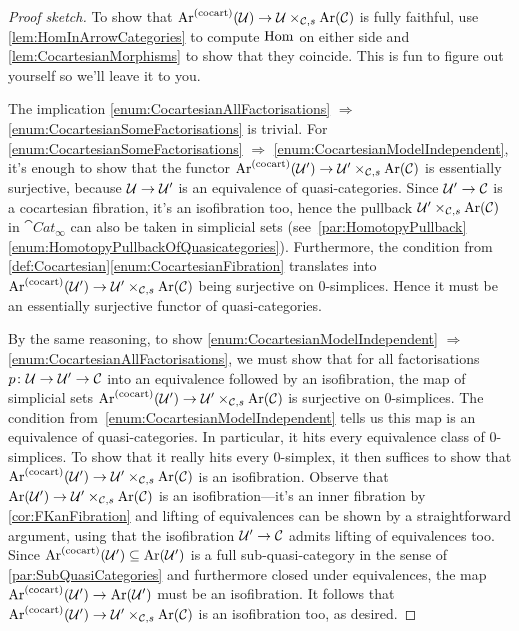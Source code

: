 \begin{proof}[Proof sketch]
	To show that $\operatorname{Ar}^{(\mathrm{cocart})}(\mathcal{U})\rightarrow \mathcal{U}\times_{\mathcal{C},s}\operatorname{Ar}(\mathcal{C})$ is fully faithful, use \cref{lem:HomInArrowCategories} to compute $\operatorname{Hom}$ on either side and \cref{lem:CocartesianMorphisms} to show that they coincide. This is fun to figure out yourself so we'll leave it to you.
	
	The implication \cref{enum:CocartesianAllFactorisations} $\Rightarrow$ \cref{enum:CocartesianSomeFactorisations} is trivial. For \cref{enum:CocartesianSomeFactorisations} $\Rightarrow$ \cref{enum:CocartesianModelIndependent}, it's enough to show that the functor $\operatorname{Ar}^{(\mathrm{cocart})}(\mathcal{U}')\rightarrow \mathcal{U}'\times_{\mathcal{C},s}\operatorname{Ar}(\mathcal{C})$ is essentially surjective, because $\mathcal{U}\rightarrow \mathcal{U}'$ is an equivalence of quasi-categories. Since $\mathcal{U}'\rightarrow \mathcal{C}$ is a cocartesian fibration, it's an isofibration too, hence the pullback $\mathcal{U}'\times_{\mathcal{C},s}\operatorname{Ar}(\mathcal{C})$ in $\cat{Cat}_\infty$ can also be taken in simplicial sets (see~\cref{par:HomotopyPullback}\cref{enum:HomotopyPullbackOfQuasicategories}). Furthermore, the condition from \cref{def:Cocartesian}\cref{enum:CocartesianFibration} translates into $\operatorname{Ar}^{(\mathrm{cocart})}(\mathcal{U}')\rightarrow \mathcal{U}'\times_{\mathcal{C},s}\operatorname{Ar}(\mathcal{C})$ being surjective on $0$-simplices. Hence it must be an essentially surjective functor of quasi-categories.
	
	By the same reasoning, to show \cref{enum:CocartesianModelIndependent} $\Rightarrow$ \cref{enum:CocartesianAllFactorisations}, we must show that for all factorisations $p\colon \mathcal{U}\rightarrow \mathcal{U}'\rightarrow \mathcal{C}$ into an equivalence followed by an isofibration, the map of simplicial sets $\operatorname{Ar}^{(\mathrm{cocart})}(\mathcal{U}')\rightarrow \mathcal{U}'\times_{\mathcal{C},s}\operatorname{Ar}(\mathcal{C})$ is surjective on $0$-simplices. The condition from~\cref{enum:CocartesianModelIndependent} tells us this map is an equivalence of quasi-categories. In particular, it hits every equivalence class of $0$-simplices. To show that it really hits every $0$-simplex, it then suffices to show that $\operatorname{Ar}^{(\mathrm{cocart})}(\mathcal{U}')\rightarrow \mathcal{U}'\times_{\mathcal{C},s}\operatorname{Ar}(\mathcal{C})$ is an isofibration. Observe that $\operatorname{Ar}(\mathcal{U}')\rightarrow\mathcal{U}'\times_{\mathcal{C},s}\operatorname{Ar}(\mathcal{C})$ is an isofibration---it's an inner fibration by \cref{cor:FKanFibration} and lifting of equivalences can be shown by a straightforward argument, using that the isofibration $\mathcal{U}'\rightarrow \mathcal{C}$ admits lifting of equivalences too. Since $\operatorname{Ar}^{(\mathrm{cocart})}(\mathcal{U}')\subseteq \operatorname{Ar}(\mathcal{U}')$ is a full sub-quasi-category in the sense of \cref{par:SubQuasiCategories} and furthermore closed under equivalences, the map $\operatorname{Ar}^{(\mathrm{cocart})}(\mathcal{U}')\rightarrow \operatorname{Ar}(\mathcal{U}')$ must be an isofibration. It follows that $\operatorname{Ar}^{(\mathrm{cocart})}(\mathcal{U}')\rightarrow \mathcal{U}'\times_{\mathcal{C},s}\operatorname{Ar}(\mathcal{C})$ is an isofibration too, as desired.
\end{proof}

